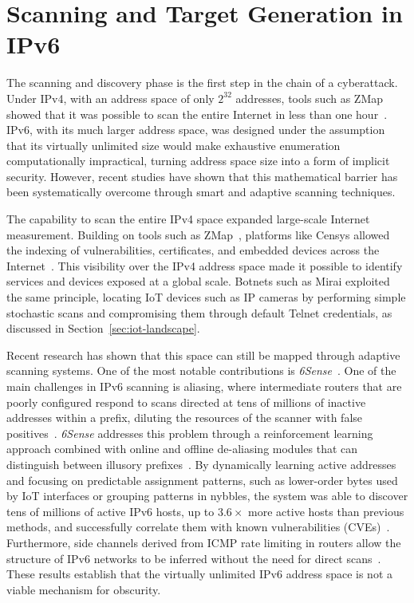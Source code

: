\section{Scanning and Target Generation in IPv6}\label{sec:scanning-ipv6}
The scanning and discovery phase is the first step in the chain of a cyberattack. Under IPv4, with an address space of only $2^{32}$ addresses, tools such as ZMap showed that it was possible to scan the entire Internet in less than one hour~\cite{durumeric2013zmap}. IPv6, with its much larger address space, was designed under the assumption that its virtually unlimited size would make exhaustive enumeration computationally impractical, turning address space size into a form of implicit security. However, recent studies have shown that this mathematical barrier has been systematically overcome through smart and adaptive scanning techniques.

The capability to scan the entire IPv4 space expanded large-scale Internet measurement. Building on tools such as ZMap~\cite{durumeric2013zmap}, platforms like Censys allowed the indexing of vulnerabilities, certificates, and embedded devices across the Internet~\cite{durumeric2015censys}. This visibility over the IPv4 address space made it possible to identify services and devices exposed at a global scale. Botnets such as Mirai exploited the same principle, locating IoT devices such as IP cameras by performing simple stochastic scans and compromising them through default Telnet credentials, as discussed in Section~\ref{sec:iot-landscape}.

Recent research has shown that this space can still be mapped through adaptive scanning systems. One of the most notable contributions is \textit{6Sense}~\cite{williams20246sense}. One of the main challenges in IPv6 scanning is aliasing, where intermediate routers that are poorly configured respond to scans directed at tens of millions of inactive addresses within a prefix, diluting the resources of the scanner with false positives~\cite{williams20246sense}. \textit{6Sense} addresses this problem through a reinforcement learning approach combined with online and offline de-aliasing modules that can distinguish between illusory prefixes~\cite{williams20246sense}. By dynamically learning active addresses and focusing on predictable assignment patterns, such as lower-order bytes used by IoT interfaces or grouping patterns in nybbles, the system was able to discover tens of millions of active IPv6 hosts, up to $3.6\times$ more active hosts than previous methods, and successfully correlate them with known vulnerabilities (CVEs)~\cite{williams20246sense}. Furthermore, side channels derived from ICMP rate limiting in routers allow the structure of IPv6 networks to be inferred without the need for direct scans~\cite{pan2023router}. These results establish that the virtually unlimited IPv6 address space is not a viable mechanism for obscurity.


